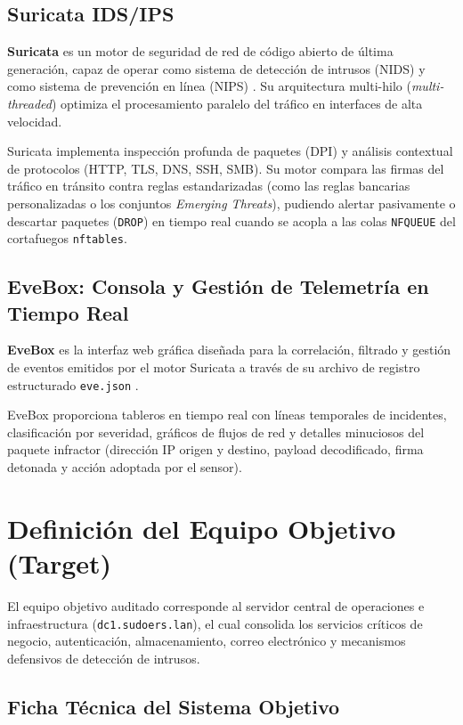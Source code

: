 \subsection{Suricata IDS/IPS}

\textbf{Suricata} es un motor de seguridad de red de código abierto de última generación, capaz de operar como sistema de detección de intrusos (NIDS) y como sistema de prevención en línea (NIPS) \citep{oisf_suricata_2024}. Su arquitectura multi-hilo (\textit{multi-threaded}) optimiza el procesamiento paralelo del tráfico en interfaces de alta velocidad.

Suricata implementa inspección profunda de paquetes (DPI) y análisis contextual de protocolos (HTTP, TLS, DNS, SSH, SMB). Su motor compara las firmas del tráfico en tránsito contra reglas estandarizadas (como las reglas bancarias personalizadas o los conjuntos \textit{Emerging Threats}), pudiendo alertar pasivamente o descartar paquetes (\texttt{DROP}) en tiempo real cuando se acopla a las colas \texttt{NFQUEUE} del cortafuegos \texttt{nftables}.

\subsection{EveBox: Consola y Gestión de Telemetría en Tiempo Real}

\textbf{EveBox} es la interfaz web gráfica diseñada para la correlación, filtrado y gestión de eventos emitidos por el motor Suricata a través de su archivo de registro estructurado \texttt{eve.json} \citep{oisf_suricata_2024}. 

EveBox proporciona tableros en tiempo real con líneas temporales de incidentes, clasificación por severidad, gráficos de flujos de red y detalles minuciosos del paquete infractor (dirección IP origen y destino, payload decodificado, firma detonada y acción adoptada por el sensor).

\section{Definición del Equipo Objetivo (Target)}

El equipo objetivo auditado corresponde al servidor central de operaciones e infraestructura (\texttt{dc1.sudoers.lan}), el cual consolida los servicios críticos de negocio, autenticación, almacenamiento, correo electrónico y mecanismos defensivos de detección de intrusos.

\subsection{Ficha Técnica del Sistema Objetivo}

